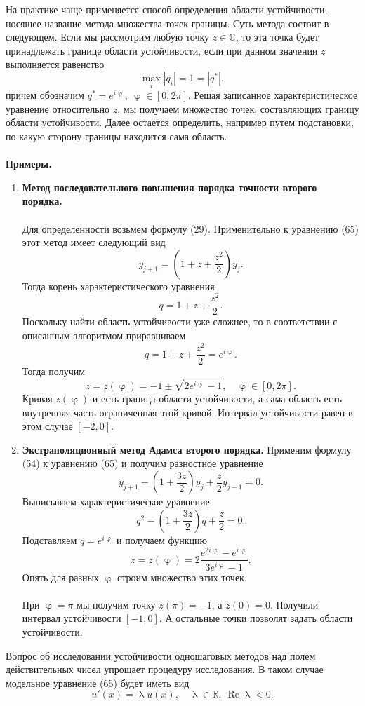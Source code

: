 \documentclass[a4paper, 12pt]{report}
\newcommand{\Rm}{\mathbb{R}}
\newcommand{\Cm}{\mathbb{C}}
\renewcommand{\varphi}{\upvarphi}
\renewcommand{\lambda}{\uplambda}
\renewcommand{\Re}{\operatorname{Re}}
\begin{document}
	 На практике чаще применяется способ определения области устойчивости, носящее название метода множества точек границы. Суть метода состоит в следующем. Если мы рассмотрим любую точку $z \in \Cm$, то эта точка будет принадлежать границе области устойчивости, если при данном значении $z$ выполняется равенство $$\underset{i}{\max}|q_i| = 1 = |q^*|,$$
	 причем обозначим $q^* = e^{i\varphi},\ \varphi \in [0, 2\pi].$ Решая записанное характеристическое уравнение относительно $z$, мы получаем множество точек, составляющих границу области устойчивости. Далее остается определить, например путем подстановки, по какую сторону границы находится сама область.\\\\
	 \textbf{Примеры.}
	 \begin{enumerate}
	 	\item \textbf{Метод последовательного повышения порядка точности второго порядка.}\\\\
	 	Для определенности возьмем формулу (29). Применительно к уравнению (65) этот метод имеет следующий вид $$y_{j+1} = \left(1+z + \dfrac {z^2}{2}\right)y_j.$$
	 	Тогда корень характеристического уравнения $$q = 1 + z + \dfrac{z^2}{2}.$$
	 	Поскольку найти область устойчивости уже сложнее, то в соответствии с описанным алгоритмом приравниваем $$q = 1 + z + \dfrac{z^2}{2} = e^{i\varphi}.$$
	 	Тогда получим $$z = z(\varphi) = - 1 \pm \sqrt {2e^{i\varphi}-1},\quad\varphi \in [0,2\pi].$$
	 	Кривая $z(\varphi)$ и есть граница области устойчивости, а сама область есть внутренняя часть ограниченная этой кривой. Интервал устойчивости равен в этом случае $[-2, 0]$.
	 	\item \textbf{Экстраполяционный метод Адамса второго порядка.}
	 	Применим формулу (54) к уравнению (65) и получим разностное уравнение $$y_{j+1}  - \left(1 + \dfrac{3z}{2}\right)y_j + \dfrac z 2 y_{j-1} = 0.$$
	 	Выписываем характеристическое уравнение $$q^2  - \left(1 + \dfrac{3z}{2}\right)q + \dfrac z 2  = 0.$$
	 	Подставляем $q = e^{i\varphi}$ и получаем функцию $$z = z(\varphi) = 2 \dfrac{e^{2i\varphi} - e^{i\varphi}}{3 e^{i\varphi} - 1}.$$
	 	Опять для разных $\varphi$ строим множество этих точек. \\\\
	 	При $\varphi = \pi$ мы получим точку $z(\pi) = -1$, а $z(0) = 0$. Получили интервал устойчивости $[-1, 0]$. А остальные точки позволят задать области устойчивости.  
	 \end{enumerate}
	 Вопрос об исследовании устойчивости одношаговых методов над полем действительных чисел упрощает процедуру исследования. В таком случае модельное уравнение (65) будет иметь вид $$u'(x) = \lambda u(x),\quad \lambda \in \Rm,\ \Re \lambda < 0.$$
\end{document}
